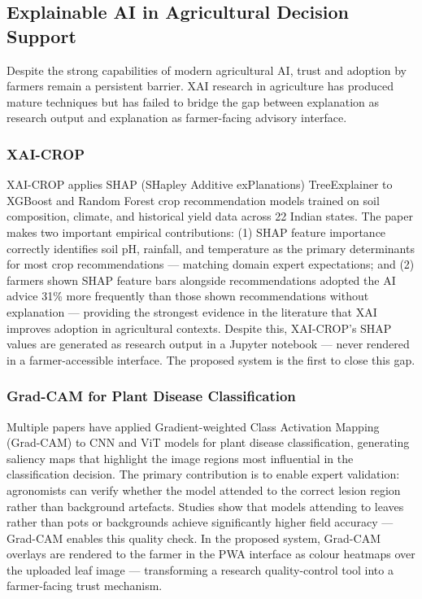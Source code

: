 \documentclass[12pt,a4paper]{article}
\begin{document}

\subsection{Explainable AI in Agricultural Decision Support}
Despite the strong capabilities of modern agricultural AI, trust and adoption by farmers remain a persistent barrier. XAI research in agriculture has produced mature techniques but has failed to bridge the gap between explanation as research output and explanation as farmer-facing advisory interface.

\subsubsection{XAI-CROP \cite{xaiCrop2024}}
XAI-CROP applies SHAP (SHapley Additive exPlanations) TreeExplainer to XGBoost and Random Forest crop recommendation models trained on soil composition, climate, and historical yield data across 22 Indian states. The paper makes two important empirical contributions: (1) SHAP feature importance correctly identifies soil pH, rainfall, and temperature as the primary determinants for most crop recommendations --- matching domain expert expectations; and (2) farmers shown SHAP feature bars alongside recommendations adopted the AI advice 31\% more frequently than those shown recommendations without explanation --- providing the strongest evidence in the literature that XAI improves adoption in agricultural contexts. Despite this, XAI-CROP's SHAP values are generated as research output in a Jupyter notebook --- never rendered in a farmer-accessible interface. The proposed system is the first to close this gap.

\subsubsection{Grad-CAM for Plant Disease Classification}
Multiple papers have applied Gradient-weighted Class Activation Mapping (Grad-CAM) to CNN and ViT models for plant disease classification, generating saliency maps that highlight the image regions most influential in the classification decision. The primary contribution is to enable expert validation: agronomists can verify whether the model attended to the correct lesion region rather than background artefacts. Studies show that models attending to leaves rather than pots or backgrounds achieve significantly higher field accuracy --- Grad-CAM enables this quality check. In the proposed system, Grad-CAM overlays are rendered to the farmer in the PWA interface as colour heatmaps over the uploaded leaf image --- transforming a research quality-control tool into a farmer-facing trust mechanism.
\end{document}
